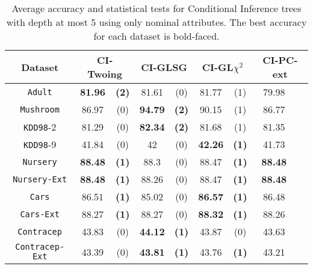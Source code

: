 \begin{table*}
\small
\centering
    \caption{Average accuracy and statistical tests  for  Conditional Inference trees 
with depth at most 5 using only nominal attributes. The best accuracy for each dataset is bold-faced.}
\label{tab:ctree-5}
\begin{tabular}{c|cc|cc|cc|cc} 
Dataset  &   \multicolumn{2}{c|}{CI-Twoing} &   \multicolumn{2}{c|}{CI-GLSG} & \multicolumn{2}{c|}{CI-GL$\chi^2$}& \multicolumn{2}{c}{CI-PC-ext} \\  \hline   
{\tt Adult}        &{\bf 81.96} &{\bf  (2)} & 81.61       & (0)       & 81.77       & (1)       & 79.98       &           \\
{\tt Mushroom}     &86.97       & (0)       &{\bf  94.79 }& {\bf (2)} & 90.15       & (1)       & 86.77       &           \\
{\tt KDD98}-2      &81.29       & (0)       & {\bf 82.34 }& {\bf (2) }& 81.68       & (1)       & 81.35       &           \\
{\tt KDD98}-9      &41.84       & (0)       & 42          & (0)       & {\bf 42.26} & {\bf (1)} & 41.73       &           \\
{\tt Nursery}      &{\bf 88.48} & {\bf (1)} & 88.3        & (0)       & 88.47       & {\bf (1)} &{\bf 88.48 } &           \\
{\tt Nursery-Ext}  &{\bf 88.48} & {\bf (1)} & 88.26       & (0)       & 88.47       & {\bf (1)} &{\bf 88.48 } &           \\
{\tt Cars}         &86.51       & {\bf (1)} & 85.02       & (0)       & {\bf 86.57} & {\bf (1)} & 86.48       &           \\
{\tt Cars-Ext}     &88.27       & {\bf (1) }& 88.27       & (0)       & {\bf 88.32} & {\bf (1)} & 88.26       &           \\
{\tt Contracep}    &43.83       & (0)       & {\bf 44.12} & {\bf (1)} & 43.87       & (0)       & 43.63       &           \\
{\tt Contracep-Ext}&43.39       & (0)       & {\bf 43.81} & {\bf (1)} & 43.76       & {\bf (1)} & 43.21       &           \\

\end{tabular}
\end{table*}
